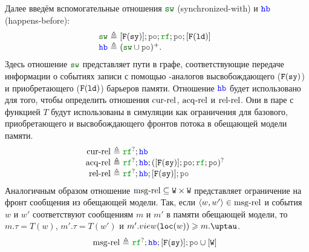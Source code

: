   Далее введём вспомогательные отношения $\lSW$ (synchronized-with) и $\lHB$ (happens-before):
  \[\begin{array}{@{}r@{~}r@{~}l}
  \lSW & \defeq & [\lDMBSY]; \lPO; \lRF; \lPO; [\lDMBLD] \\
  \lHB & \defeq & (\lSW \cup \lPO)^{+}. \\
  \end{array}\]
  Здесь отношение $\lSW$ представляет пути в графе, соответствующие передаче информации о событиях
  записи с помощью \ARM-аналогов высвобождающего (${{\mathtt{F}}}(\mathtt{sy})$) и приобретающего (${{\mathtt{F}}}(\mathtt{ld})$) барьеров
  памяти. Отношение $\lHB$ будет использовано для того, чтобы определить
  отношения ${\rm cur\text{-}rel}$, ${\rm acq\text{-}rel}$ и ${\rm rel\text{-}rel}$. Они в паре с функцией $T$ будут использованы в симуляции
  как ограничения для базового, приобретающего и высвобождающего фронтов потока в обещающей модели памяти.
  \[\begin{array}{@{}r@{~}r@{~}l}
  \curRel & \defeq & \lRF^{?}; \lHB \\
  \acqRel & \defeq & \lRF^{?}; \lHB; ([\lDMBSY]; \lPO; \lRF; \lPO)^? \\
  \relRel & \defeq & \lRF^{?}; \lHB; [\lDMBSY]; \lPO \\
  \end{array}\]
  Аналогичным образом отношение ${\rm msg\text{-}rel} \subseteq {\mathtt{W}} \times {\mathtt{W}}$ представляет ограничение на фронт сообщения
  из обещающей модели. Так, если ${\langle{w, w'}\rangle} \in {\rm msg\text{-}rel}$ и события $w$ и $w'$ соответствуют
  сообщениям $m$ и $m'$ в памяти обещающей модели, то $m.\tau = T(w)$, $m'.\tau = T(w')$ и
  $m'.\view(\lLOC(w)) \ge m.\tau$.
  \[\begin{array}{@{}r@{~}r@{~}l}
  \msgRel & \defeq & \lRF^{?}; \lHB; [\lDMBSY]; \lPO \cup [\lW] \\
  \end{array}\]
  
